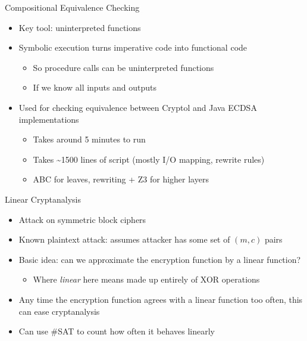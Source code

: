 \documentclass[ignorenonframetext,]{beamer}
\providecommand{\tightlist}{%
  \setlength{\itemsep}{0pt}\setlength{\parskip}{0pt}}
\begin{document}
\begin{frame}{Compositional Equivalence Checking}

\begin{itemize}
\tightlist
\item
  Key tool: uninterpreted functions
\item
  Symbolic execution turns imperative code into functional code

  \begin{itemize}
  \tightlist
  \item
    So procedure calls can be uninterpreted functions
  \item
    \alert{If} we know all inputs and outputs
  \end{itemize}
\item Used for checking equivalence between Cryptol and Java ECDSA
  implementations

  \begin{itemize}
  \tightlist
  \item
    Takes around 5 minutes to run
  \item Takes \textasciitilde{}1500 lines of script (mostly I/O mapping, rewrite
    rules)
  \item
    ABC for leaves, rewriting + Z3 for higher layers
  \end{itemize}
\end{itemize}

\end{frame}

\begin{frame}{Linear Cryptanalysis}

\begin{itemize}
\tightlist
\item
  Attack on symmetric block ciphers
\item
  Known plaintext attack: assumes attacker has some set of \((m, c)\)
  pairs
\item
  Basic idea: can we approximate the encryption function by a linear
  function?

  \begin{itemize}
  \tightlist
  \item
    Where \emph{linear} here means made up entirely of XOR operations
  \end{itemize}
\item
  Any time the encryption function agrees with a linear function too
  often, this can ease cryptanalysis
\item
  Can use \#SAT to count how often it behaves linearly
\end{itemize}

\end{frame}
\end{document}
